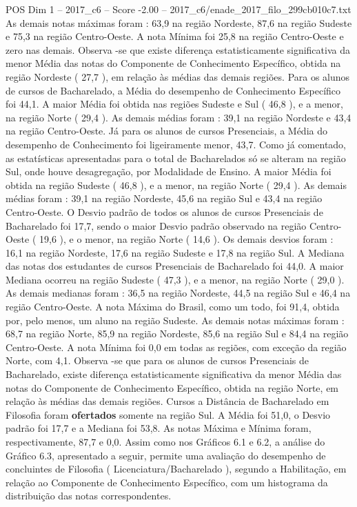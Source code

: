 \begin{textsample}{POS Dim 1 – 2017\_c6 – Score -2.00 – 2017\_c6/enade\_2017\_filo\_299cb010c7.txt}
As demais notas máximas foram : 63,9 na região Nordeste, 87,6 na região Sudeste e 75,3 na região Centro-Oeste.
A nota Mínima foi 25,8 na região Centro-Oeste e zero nas demais.
Observa -se que existe diferença estatisticamente significativa da menor Média das notas do Componente de Conhecimento Específico, obtida na região Nordeste ( 27,7 ), em relação às médias das demais regiões.
Para os alunos de cursos de Bacharelado, a Média do desempenho de Conhecimento Específico foi 44,1.
A maior Média foi obtida nas regiões Sudeste e Sul ( 46,8 ), e a menor, na região Norte ( 29,4 ).
As demais médias foram : 39,1 na região Nordeste e 43,4 na região Centro-Oeste.
Já para os alunos de cursos Presenciais, a Média do desempenho de Conhecimento foi ligeiramente menor, 43,7.
Como já comentado, as estatísticas apresentadas para o total de Bacharelados só se alteram na região Sul, onde houve desagregação, por Modalidade de Ensino.
A maior Média foi obtida na região Sudeste ( 46,8 ), e a menor, na região Norte ( 29,4 ).
As demais médias foram : 39,1 na região Nordeste, 45,6 na região Sul e 43,4 na região Centro-Oeste.
O Desvio padrão de todos os alunos de cursos Presenciais de Bacharelado foi 17,7, sendo o maior Desvio padrão observado na região Centro-Oeste ( 19,6 ), e o menor, na região Norte ( 14,6 ).
Os demais desvios foram : 16,1 na região Nordeste, 17,6 na região Sudeste e 17,8 na região Sul.
A Mediana das notas dos estudantes de cursos Presenciais de Bacharelado foi 44,0.
A maior Mediana ocorreu na região Sudeste ( 47,3 ), e a menor, na região Norte ( 29,0 ).
As demais medianas foram : 36,5 na região Nordeste, 44,5 na região Sul e 46,4 na região Centro-Oeste.
A nota Máxima do Brasil, como um todo, foi 91,4, obtida por, pelo menos, um aluno na região Sudeste.
As demais notas máximas foram : 68,7 na região Norte, 85,9 na região Nordeste, 85,6 na região Sul e 84,4 na região Centro-Oeste.
A nota Mínima foi 0,0 em todas as regiões, com exceção da região Norte, com 4,1.
Observa -se que para os alunos de cursos Presenciais de Bacharelado, existe diferença estatisticamente significativa da menor Média das notas do Componente de Conhecimento Específico, obtida na região Norte, em relação às médias das demais regiões.
Cursos a Distância de Bacharelado em Filosofia foram \textbf{ofertados} somente na região Sul.
A Média foi 51,0, o Desvio padrão foi 17,7 e a Mediana foi 53,8.
As notas Máxima e Mínima foram, respectivamente, 87,7 e 0,0.
Assim como nos Gráficos 6.1 e 6.2, a análise do Gráfico 6.3, apresentado a seguir, permite uma avaliação do desempenho de concluintes de Filosofia ( Licenciatura/Bacharelado ), segundo a Habilitação, em relação ao Componente de Conhecimento Específico, com um histograma da distribuição das notas correspondentes.

\end{textsample}
